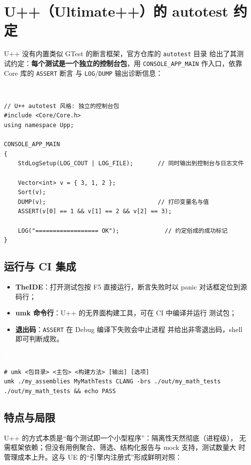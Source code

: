 \documentclass[12pt,a4paper,fontset=fandol]{ctexbook}
\newcommand{\cpplabel}{%
  \begin{tcolorbox}[enhanced,colback=cppheadbg,colframe=cppheadbg,
    arc=1mm,boxrule=0mm,left=6pt,right=6pt,top=2pt,bottom=2pt,
    halign=left,oversize]
    \textcolor{white}{\small\bfseries C++}
  \end{tcolorbox}\vspace{-4pt}}
\newcommand{\bashlabel}{%
  \begin{tcolorbox}[enhanced,colback=black!80,colframe=black!80,
    arc=1mm,boxrule=0mm,left=6pt,right=6pt,top=2pt,bottom=2pt,
    halign=left,oversize]
    \textcolor{white}{\small\bfseries Shell}
  \end{tcolorbox}\vspace{-4pt}}
\begin{document}
\section{U++（Ultimate++）的 autotest 约定}

U++ 没有内置类似 GTest 的断言框架，官方仓库的 \texttt{autotest} 目录
给出了其测试约定：\textbf{每个测试是一个独立的控制台包}，用
\texttt{CONSOLE\_APP\_MAIN} 作入口，依靠 Core 库的 \texttt{ASSERT} 断言
与 \texttt{LOG}/\allowbreak{}\texttt{DUMP} 输出诊断信息：

\cpplabel
\begin{lstlisting}
// U++ autotest 风格: 独立的控制台包
#include <Core/Core.h>
using namespace Upp;

CONSOLE_APP_MAIN
{
    StdLogSetup(LOG_COUT | LOG_FILE);       // 同时输出到控制台与日志文件

    Vector<int> v = { 3, 1, 2 };
    Sort(v);
    DUMP(v);                                // 打印变量名与值
    ASSERT(v[0] == 1 && v[1] == 2 && v[2] == 3);

    LOG("================== OK");             // 约定俗成的成功标记
}
\end{lstlisting}

\subsection{运行与 CI 集成}

\begin{itemize}
  \item \textbf{TheIDE}：打开测试包按 F5 直接运行，断言失败时以 panic
        对话框定位到源码行；
  \item \textbf{umk 命令行}：U++ 的无界面构建工具，可在 CI 中编译并运行
        测试包；
  \item \textbf{退出码}：\texttt{ASSERT} 在 Debug 编译下失败会中止进程
        并给出非零退出码，shell 即可判断成败。
\end{itemize}

\bashlabel
\begin{lstlisting}
# umk <包目录> <主包> <构建方法> [输出] [选项]
umk ./my_assemblies MyMathTests CLANG -brs ./out/my_math_tests
./out/my_math_tests && echo PASS
\end{lstlisting}

\subsection{特点与局限}

U++ 的方式本质是“每个测试即一个小型程序”：隔离性天然彻底（进程级），
无需框架依赖；但没有用例聚合、筛选、结构化报告与 mock 支持，测试数量大
时管理成本上升。这与 UE 的“引擎内注册式”形成鲜明对照：
\end{document}
